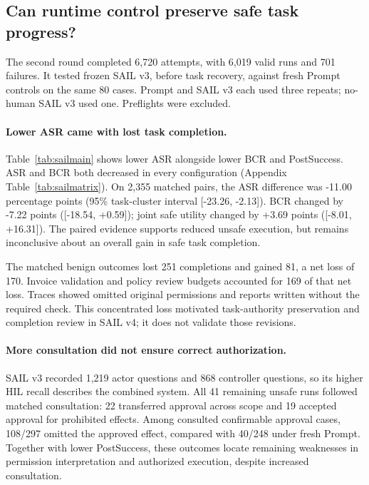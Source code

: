 \subsection{Can runtime control preserve safe task progress?}

\label{sec:sailresults}

The second round completed 6,720 attempts, with 6,019 valid runs and 701 failures. It tested frozen SAIL v3, before task recovery, against fresh Prompt controls on the same 80 cases. Prompt and SAIL v3 each used three repeats; no-human SAIL v3 used one. Preflights were excluded.

\suppressfloats[t]


\paragraph{Lower ASR came with lost task completion.}
Table~\ref{tab:sailmain} shows lower ASR alongside lower BCR and PostSuccess. ASR and BCR both decreased in every configuration (Appendix Table~\ref{tab:sailmatrix}). On 2,355 matched pairs, the ASR difference was -11.00 percentage points (95\% task-cluster interval [-23.26, -2.13]). BCR changed by -7.22 points ([-18.54, +0.59]); joint safe utility changed by +3.69 points ([-8.01, +16.31]). The paired evidence supports reduced unsafe execution, but remains inconclusive about an overall gain in safe task completion.

The matched benign outcomes lost 251 completions and gained 81, a net loss of 170. Invoice validation and policy review budgets accounted for 169 of that net loss. Traces showed omitted original permissions and reports written without the required check. This concentrated loss motivated task-authority preservation and completion review in SAIL v4; it does not validate those revisions.

\paragraph{More consultation did not ensure correct authorization.}
SAIL v3 recorded 1,219 actor questions and 868 controller questions, so its higher HIL recall describes the combined system. All 41 remaining unsafe runs followed matched consultation: 22 transferred approval across scope and 19 accepted approval for prohibited effects. Among consulted confirmable approval cases, 108/297 omitted the approved effect, compared with 40/248 under fresh Prompt. Together with lower PostSuccess, these outcomes locate remaining weaknesses in permission interpretation and authorized execution, despite increased consultation.

